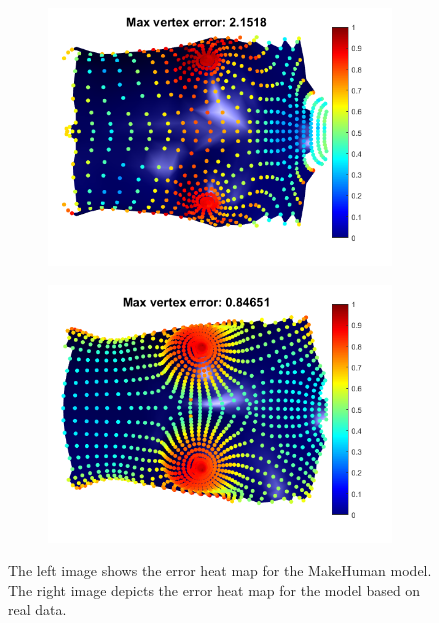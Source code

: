 \begin{figure}
\centering
\begin{subfigure}{.5\textwidth}
  \centering
  \includegraphics[width=1\linewidth]{figures/ceresMhErrorMapBefore}
\end{subfigure}%
\begin{subfigure}{.5\textwidth}
  \centering
  \includegraphics[width=1\linewidth]{figures/ceresRealErrorMapBefore}
\end{subfigure}
\caption[Parametric model comparison]{The left image shows the error heat map for the MakeHuman model. The right image depicts the error heat map for the model based on real data.}
\label{fig:compparammodel}
\end{figure}

